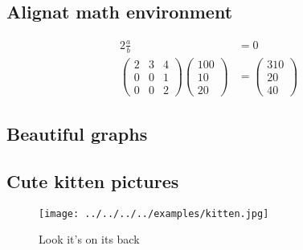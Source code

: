 \documentclass{article}%
\begin{document}
\subsection{Alignat math environment}%
\label{subsec:Alignat math environment}%
\begin{alignat*}{2}%
\frac{a}{b} &= 0 \\%
\begin{pmatrix}%
2&3&4\\%
0&0&1\\%
0&0&2%
\end{pmatrix}%
\begin{pmatrix}%
100\\%
10\\%
20%
\end{pmatrix}%
&=%
\begin{pmatrix}%
310\\%
20\\%
40%
\end{pmatrix}%
\end{alignat*}

%
\subsection{Beautiful graphs}%
\label{subsec:Beautiful graphs}%

%
\subsection{Cute kitten pictures}%
\label{subsec:Cute kitten pictures}%


\begin{figure}[h!]%
\centering%
\texttt{[image: ../../../../examples/kitten.jpg]}%
\caption{Look it's on its back}%
\end{figure}

%
\end{document}
